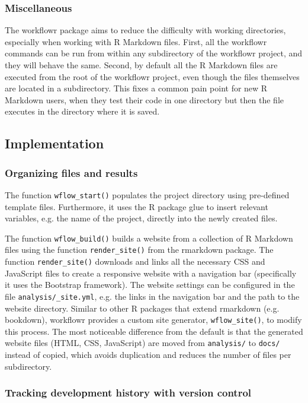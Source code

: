 \documentclass[9pt,a4paper]{extarticle}
\begin{document}
\subsubsection*{Miscellaneous}

The workflowr package aims to reduce the difficulty with working
directories, especially when working with R Markdown files. First, all
the workflowr commands can be run from within any subdirectory of the
workflowr project, and they will behave the same. Second, by default all
the R Markdown files are executed from the root of the workflowr
project, even though the files themselves are located in a subdirectory.
This fixes a common pain point for new R Markdown users, when they test
their code in one directory but then the file executes in the directory
where it is saved.

\subsection*{Implementation}

\subsubsection*{Organizing files and results}

The function \verb|wflow_start()| populates the project directory using
pre-defined template files. Furthermore, it uses the R package glue to
insert relevant variables, e.g. the name of the project, directly into
the newly created files.

The function \verb|wflow_build()| builds a website from a collection of R
Markdown files using the function \verb|render_site()| from the rmarkdown
package. The function \verb|render_site()| downloads and links all the
necessary CSS and JavaScript files to create a responsive website with a
navigation bar (specifically it uses the Bootstrap framework). The
website settings can be configured in the file
\verb|analysis/_site.yml|, e.g. the links in the navigation bar and the
path to the website directory. Similar to other R packages that extend
rmarkdown (e.g. bookdown), workflowr provides a custom site generator,
\verb|wflow_site()|, to modify this process. The most noticeable difference
from the default is that the generated website files (HTML, CSS,
JavaScript) are moved from \verb|analysis/| to \verb|docs/| instead of
copied, which avoids duplication and reduces the number of files per
subdirectory.

\subsubsection*{Tracking development history with version control}
\end{document}
